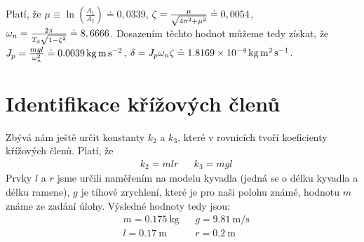 \documentclass[11pt,a4paper]{article}
\begin{document}
Platí, že $\mu \equiv \ln{(\frac{A_1}{A_2})} \doteq 0,0339$, $\zeta = \frac{\mu}{\sqrt{4 \pi^2 + \mu^2}} \doteq 0,0054$, $\omega_n = \frac{2 \pi}{T_d \sqrt{1 - \zeta^2}} \doteq 8,6666$. Dosazením těchto hodnot můžeme tedy získat, že $J_p = \frac{m g l}{\omega_n^2} \doteq \SI{0.0039}{\kilo \gram \metre \per \second \squared}$, $\delta = J_p \wn \ut \doteq \SI{1.8169e-04}{\kg \m \squared \per \second}$.



\section{Identifikace křížových členů}
Zbývá nám ještě určit konstanty $k_2$ a $k_3$, které v rovnicích tvoří koeficienty křížových členů. Platí, že
\begin{align*}
&k_2 = mlr && k_3 = mgl
\end{align*}
Prvky $l$ a $r$ jsme určili naměřením na modelu kyvadla (jedná se o délku kyvadla a délku ramene), $g$ je tíhové zrychlení, které je pro naši polohu známé, hodnotu $m$ známe ze zadání úlohy. Výsledné hodnoty tedy jsou:
\begin{align*}
&m = \SI{0,175}{ \kilo \gram} &&g = \SI{9,81}{\meter \per \second}	\\
&l = \SI{0,17}{\meter} &&r = \SI{0,2}{\meter}
\end{align*}



\end{document}
